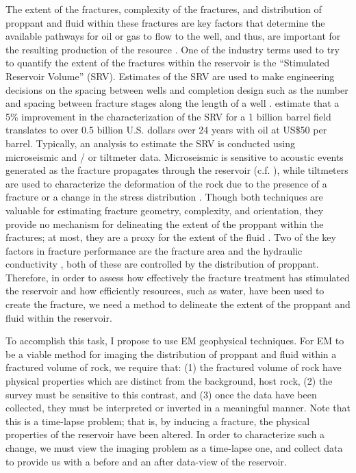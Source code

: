 The extent of the fractures, complexity of the fractures, and distribution of proppant and fluid within these fractures are key factors that determine the available pathways for oil or gas to flow to the well, and thus, are important for the resulting production of the resource \citep{Brannon2008, Cipolla2009}. One of the industry terms used to try to quantify the extent of the fractures within the reservoir is the ``Stimulated Reservoir Volume'' (SRV). Estimates of the SRV are used to make engineering decisions on the spacing between wells and completion design such as the number and spacing between fracture stages along the length of a well \citep{Palisch2016}. \cite{Hoversten2015} estimate that a 5\% improvement in the characterization of the SRV for a 1 billion barrel field translates to over 0.5 billion U.S. dollars over 24 years with oil at US\$50 per barrel. Typically, an analysis to estimate the SRV is conducted using microseismic and / or tiltmeter data. Microseismic is sensitive to acoustic events generated as the fracture propagates through the reservoir (c.f. \cite{Mayerhofer2010, Cipolla2009, Maxwell2002, Warpinski1996}), while tiltmeters are used to characterize the deformation of the rock due to the presence of a fracture or a change in the stress distribution \citep{Mayerhofer2010, Wright1998}. Though both techniques are valuable for estimating fracture geometry, complexity, and orientation, they provide no mechanism for delineating the extent of the proppant within the fractures; at most, they are a proxy for the extent of the fluid \citep{Palisch2016}. Two of the key factors in fracture performance are the fracture area and the hydraulic conductivity \citep{Cipolla2014}, both of these are controlled by the distribution of proppant. Therefore, in order to assess how effectively the fracture treatment has stimulated the reservoir and how efficiently resources, such as water, have been used to create the fracture, we need a method to delineate the extent of the proppant and fluid within the reservoir.




To accomplish this task, I propose to use EM geophysical techniques. For EM to be a viable method for imaging the distribution of proppant and fluid within a fractured volume of rock, we require that: (1) the fractured volume of rock have physical properties which are distinct from the background, host rock, (2) the survey must be sensitive to this contrast, and (3) once the data have been collected, they must be interpreted or inverted in a meaningful manner. Note that this is a time-lapse problem; that is, by inducing a fracture, the physical properties of the reservoir have been altered. In order to characterize such a change, we must view the imaging problem as a time-lapse one, and collect data to provide us with a before and an after data-view of the reservoir.

